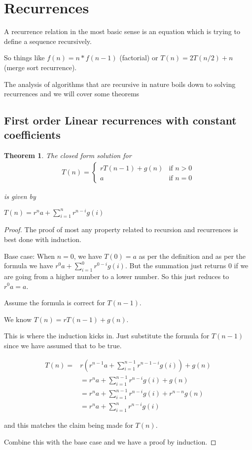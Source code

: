 \documentclass[12pt]{article}
\newtheorem{theorem}{Theorem}
\begin{document}
\section*{Recurrences}

A recurrence relation in the most basic sense is an equation which is trying to define a sequence recursively.

So things like $f(n) = n * f(n-1)$ (factorial) or $T(n) = 2T(n/2) + n$ (merge sort recurrence). 

The analysis of algorithms that are recursive in nature boils down to solving recurrences and we will cover some theorems

\subsection*{First order Linear recurrences with constant coefficients}

\begin{theorem}
The closed form solution for
\begin{align*}
T(n) = \begin{cases}
rT(n-1) + g(n) & \mbox{if } n > 0\\
a & \mbox{if } n = 0
\end{cases}
\end{align*}

is given by

$T(n) = r^n a + \displaystyle\sum_{i=1}^n r^{n-i} g(i)$

\end{theorem}

\begin{proof}
The proof of most any property related to recursion and recurrences is best done with induction. 

Base case: When $n=0$, we have $T(0)= a$ as per the definition and as per the formula we have $r^0 a + \sum_{i=1}^0 r^{0-i}g(i)$. But the summation just returns 0 if we are going from a higher number to a lower number. So this just reduces to $r^0 a = a$.

Assume the formula is correct for $T(n-1)$.

We know $T(n) = rT(n-1) + g(n)$.

This is where the induction kicks in. Just substitute the formula for $T(n-1)$ since we have assumed that to be true.

\begin{align*}
T(n) = 
&r (r^{n-1} a + \sum_{i=1}^{n-1} r^{n-1-i} g(i)) + g(n) \\
&= r^n a + \sum_{i=1}^{n-1} r^{n-i} g(i) + g(n) \\
&= r^n a + \sum_{i=1}^{n-1} r^{n-i} g(i) + r^{n-n}g(n) \\
&= r^n a + \sum_{i=1}^{n} r^{n-i} g(i) 
\end{align*}

and this matches the claim being made for $T(n)$.

Combine this with the base case and we have a proof by induction.

\end{proof}
\end{document}
